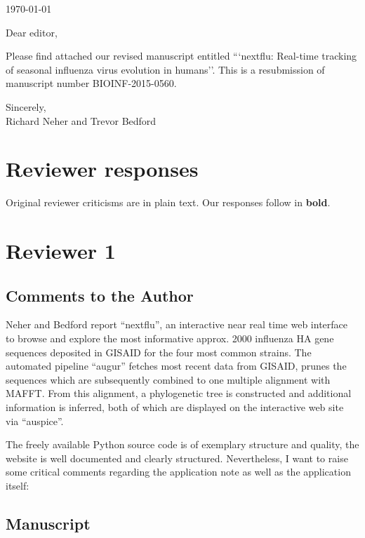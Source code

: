 \documentclass[11pt,oneside,letterpaper]{article}
\begin{document}

\today

\vspace{1cm}

Dear editor,

Please find attached our revised manuscript entitled ```nextflu: Real-time tracking of seasonal influenza virus evolution in humans''.  This is a resubmission of manuscript number BIOINF-2015-0560.

Sincerely,\\
Richard Neher and Trevor Bedford

\restoregeometry

\newpage

\section*{Reviewer responses}

Original reviewer criticisms are in plain text.  Our responses follow in \textbf{bold}.  

\section*{Reviewer 1}

\subsection*{Comments to the Author}

Neher and Bedford report ``nextflu'', an interactive near real time web interface to browse and explore the most informative approx. 2000 influenza HA gene sequences deposited in GISAID for the four most common strains. The automated pipeline ``augur'' fetches most recent data from GISAID, prunes the sequences which are subsequently combined to one multiple alignment with MAFFT. From this alignment, a phylogenetic tree is constructed and additional information is inferred, both of which are displayed on the interactive web site via ``auspice''.

The freely available Python source code is of exemplary structure and quality, the website is well documented and clearly structured. Nevertheless, I want to raise some critical comments regarding the application note as well as the application itself:

\subsection*{Manuscript}
\end{document}
